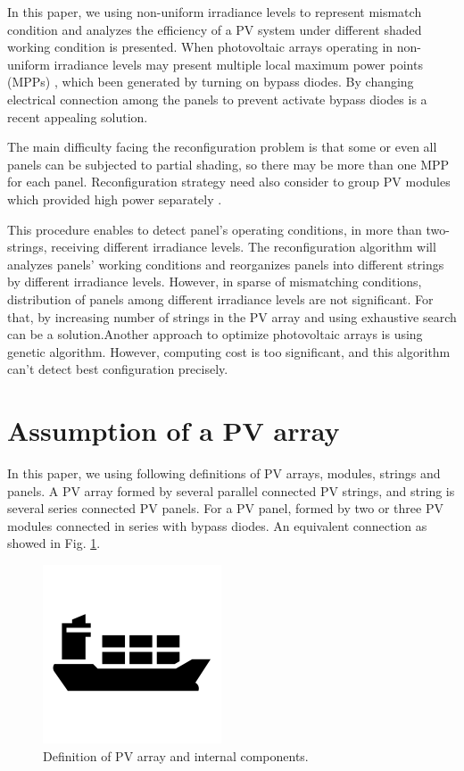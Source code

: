 \documentclass[conference]{IEEEtran}
\begin{document}
In this paper, we using non-uniform irradiance levels to represent mismatch condition and analyzes the efficiency of a PV system under different shaded working condition is presented. When photovoltaic arrays operating in non-uniform irradiance levels may present multiple local maximum power points (MPPs) \cite{b1}, which been generated by turning on bypass diodes. By changing electrical connection among the panels to prevent activate bypass diodes is a recent appealing solution\cite{b2}.

The main difficulty facing the reconfiguration problem is that some or even all panels can be subjected to partial shading, so there may be more than one MPP for each panel. Reconfiguration strategy need also consider to group PV modules which provided high power separately\cite{b3} \cite{b4}.

This procedure enables to detect panel's operating conditions, in more than two-strings, receiving different irradiance levels. The reconfiguration algorithm will analyzes panels' working conditions and reorganizes panels into different strings by different irradiance levels. However, in sparse of mismatching conditions, distribution of panels among different irradiance levels are not significant. For that, by increasing number of strings in the PV array and using exhaustive search can be a solution\cite{b3}.Another approach to optimize photovoltaic arrays is using genetic algorithm\cite{b5}. However, computing cost is too significant, and this algorithm can't detect best configuration precisely.



\section{Assumption of a PV array}
In this paper, we using following definitions of PV arrays, modules, strings and panels. A PV array formed by several parallel connected PV strings, and string is several series connected PV panels. For a PV panel, formed by two or three PV modules connected in series with bypass diodes. An equivalent connection as showed in Fig. \ref{fig1}.
\begin{figure}[htbp]
\centerline{\includegraphics{fig1.png}}
\caption{Definition of PV array and internal components.}
\label{fig1}
\end{figure}
\end{document}
